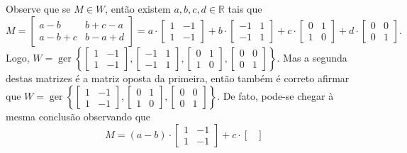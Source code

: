 \documentclass[12pt,a4paper]{article}
\newcommand*\R{\mathbb{R}}
\begin{document}
\begin{ExerciseList}
\Answer
Observe que se $M \in W$, então existem $a,b,c,d \in \R$ tais que
\[
M = \begin{bmatrix}
a-b     & b+c-a \\
a-b+c & b-a + d
\end{bmatrix}
=
a\cdot
\begin{bmatrix}
1 & -1 \\
1 & -1
\end{bmatrix}
+b\cdot
\begin{bmatrix}
-1 & 1 \\
-1 & 1
\end{bmatrix}
+c\cdot
\begin{bmatrix}
0 & 1 \\
1 & 0
\end{bmatrix}
+d\cdot
\begin{bmatrix}
0 & 0 \\
0 & 1
\end{bmatrix}.
\]
Logo, $W = \operatorname{ger}\left\{
\begin{bmatrix}
1 & -1 \\
1 & -1
\end{bmatrix},
\begin{bmatrix}
-1 & 1 \\
-1 & 1
\end{bmatrix},
\begin{bmatrix}
0 & 1 \\
1 & 0
\end{bmatrix},
\begin{bmatrix}
0 & 0 \\
0 & 1
\end{bmatrix}
\right\}$. Mas a segunda destas matrizes é a matriz oposta da primeira, então também é correto afirmar que $W = \operatorname{ger}\left\{
\begin{bmatrix}
1 & -1 \\
1 & -1
\end{bmatrix},
\begin{bmatrix}
0 & 1 \\
1 & 0
\end{bmatrix},
\begin{bmatrix}
0 & 0 \\
0 & 1
\end{bmatrix}
\right\}$. De fato, pode-se chegar à mesma conclusão observando que
\[
M =
(a-b)\cdot
\begin{bmatrix}
1 & -1 \\
1 & -1
\end{bmatrix}
+c\cdot
\begin{bmatrix}

\end{bmatrix}\]
\end{ExerciseList}
\end{document}
